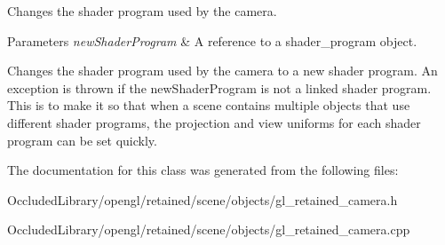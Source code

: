 Changes the shader program used by the camera. 


\begin{DoxyParams}{Parameters}
{\em new\+Shader\+Program} & A reference to a shader\+\_\+program object.\\
\hline
\end{DoxyParams}
Changes the shader program used by the camera to a new shader program. An exception is thrown if the new\+Shader\+Program is not a linked shader program. This is to make it so that when a scene contains multiple objects that use different shader programs, the projection and view uniforms for each shader program can be set quickly. 

The documentation for this class was generated from the following files\+:\begin{DoxyCompactItemize}
\item 
Occluded\+Library/opengl/retained/scene/objects/gl\+\_\+retained\+\_\+camera.\+h\item 
Occluded\+Library/opengl/retained/scene/objects/gl\+\_\+retained\+\_\+camera.\+cpp\end{DoxyCompactItemize}
